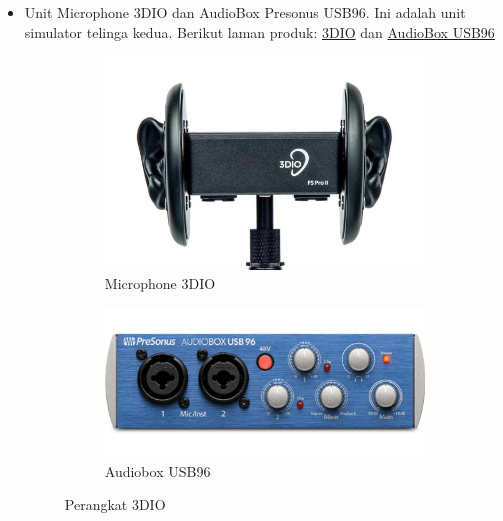 \documentclass{article}
\begin{document}
\begin{itemize}
		\item Unit Microphone 3DIO dan AudioBox Presonus USB96. Ini adalah unit simulator telinga kedua.
		Berikut laman produk: \href{https://3diosound.com/products/free-space-pro-binaural-microphone}{3DIO}
		dan \href{https://www.frontendaudio.com/presonus-audiobox-usb-96-usb-audio-interface/}{AudioBox USB96}

		\begin{figure}[H]
			\centering
			\begin{subfigure}[]{.40\textwidth}
				\includegraphics[width=\textwidth]{images/3dio}
				\caption{Microphone 3DIO}
			\end{subfigure}
			\begin{subfigure}[]{.40\textwidth}
				\includegraphics[width=\textwidth]{images/audiobox}
				\caption{Audiobox USB96}
			\end{subfigure}
			\caption{Perangkat 3DIO}
		\end{figure}

%


\end{itemize}
\end{document}
